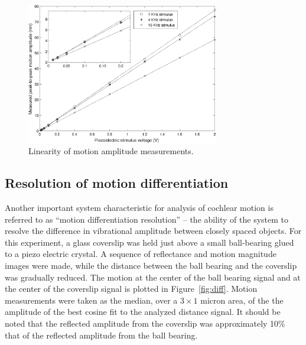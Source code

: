 \begin{figure}[h!]
\centering
\includegraphics[width=0.75\textwidth]{Images/Results/motion_linearity.png}
\caption{Linearity of motion amplitude measurements.\label{fig:motion_linearity}}
\end{figure}

\subsection{Resolution of motion differentiation}

Another important system characteristic for analysis of cochlear motion is referred to as ``motion differentiation resolution'' -- the ability of the system to resolve the difference in vibrational amplitude between closely spaced objects. For this experiment, a glass coverslip was held just above a small ball-bearing glued to a piezo electric crystal. A sequence of reflectance and motion magnitude images were made, while the distance between the ball bearing and the coverslip was gradually reduced. The motion at the center of the ball bearing signal and at the center of the coverslip signal is plotted in Figure~\ref{fig:diff}. Motion measurements were taken as the median, over a $3 \times 1$ micron area, of the the amplitude of the best cosine fit to the analyzed distance signal. It should be noted that the reflected amplitude from the coverslip was approximately 10\% that of the reflected amplitude from the ball bearing.

